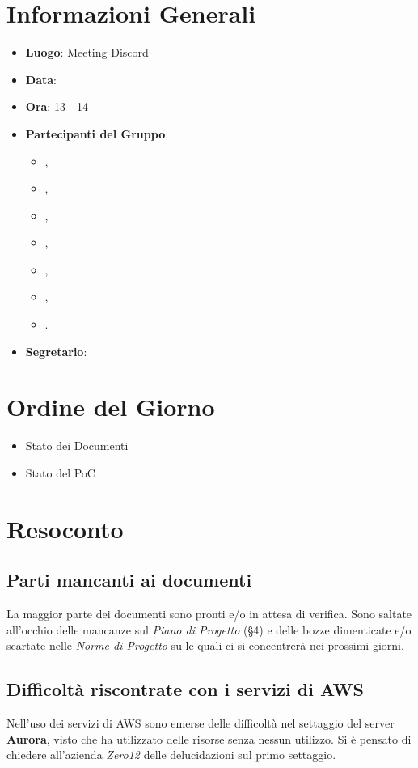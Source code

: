 \section{Informazioni Generali}

\begin{itemize}
\item{\textbf{Luogo}}: Meeting Discord
\item{\textbf{Data}}: \D
\item{\textbf{Ora}}: 13 - 14
\item{\textbf{Partecipanti del Gruppo}}: 
	\begin{itemize}
	\item{\EP{},} 
	\item{\FP{},}
	\item{\GC{},}
	\item{\LW{},}
	\item{\MB{},}
	\item{\MG{},}
	\item{\PV{}.}
	\end{itemize} 
\item{\textbf{Segretario}}: \PV{}	
\end{itemize}

\section{Ordine del Giorno}
\begin{itemize}
\item{Stato dei Documenti}
\item{Stato del PoC}
\end{itemize}

\section{Resoconto}
 
\subsection{Parti mancanti ai documenti} 
La maggior parte dei documenti sono pronti e/o in attesa di verifica. 
Sono saltate all'occhio delle mancanze sul \textit{Piano di Progetto} (§4) e delle bozze dimenticate e/o scartate nelle \textit{Norme di Progetto} su le quali ci si concentrerà nei prossimi giorni.
 
\subsection{Difficoltà riscontrate con i servizi di AWS}
Nell'uso dei servizi di AWS sono emerse delle difficoltà nel settaggio del server \textbf{Aurora}, visto che ha utilizzato delle risorse senza nessun utilizzo. Si è pensato di chiedere all'azienda \textit{Zero12} delle delucidazioni sul primo settaggio.

